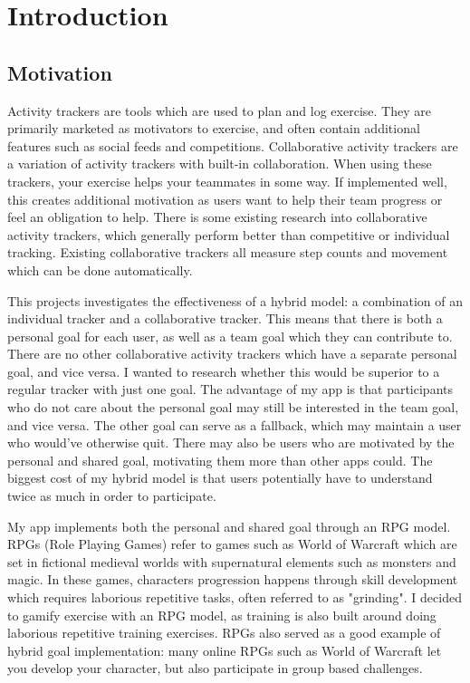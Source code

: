 \documentclass{l4proj}
\begin{document}
\chapter{Introduction}

\section{Motivation}

Activity trackers are tools which are used to plan and log exercise. They are primarily marketed as motivators to exercise, and often contain additional features such as social feeds and competitions. Collaborative activity trackers are a variation of activity trackers with built-in collaboration. When using these trackers, your exercise helps your teammates in some way. If implemented well, this creates additional motivation as users want to help their team progress or feel an obligation to help. There is some existing research into collaborative activity trackers, which generally perform better than competitive or individual tracking. Existing collaborative trackers all measure step counts and movement which can be done automatically. 

This projects investigates the effectiveness of a hybrid model: a combination of an individual tracker and a collaborative tracker. This means that there is both a personal goal for each user, as well as a team goal which they can contribute to. There are no other collaborative activity trackers which have a separate personal goal, and vice versa. I wanted to research whether this would be superior to a regular tracker with just one goal. The advantage of my app is that participants who do not care about the personal goal may still be interested in the team goal, and vice versa. The other goal can serve as a fallback, which may maintain a user who would've otherwise quit. There may also be users who are motivated by the personal and shared goal, motivating them more than other apps could. The biggest cost of my hybrid model is that users potentially have to understand twice as much in order to participate. 

My app implements both the personal and shared goal through an RPG model. RPGs (Role Playing Games) refer to games such as World of Warcraft which are set in fictional medieval worlds with supernatural elements such as monsters and magic. In these games, characters progression happens through skill development which requires laborious repetitive tasks, often referred to as "grinding". I decided to gamify exercise with an RPG model, as training is also built around doing laborious repetitive training exercises. RPGs also served as a good example of hybrid goal implementation: many online RPGs such as World of Warcraft let you develop your character, but also participate in group based challenges.
\end{document}
